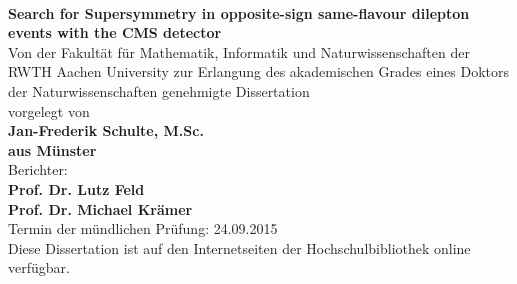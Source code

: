 \thispagestyle{empty}
\begin{center}
  ~ \\
  \vspace{-0.5cm}
 {\huge\bf{Search for Supersymmetry in opposite-sign same-flavour dilepton events with the CMS detector}\\}
  \vspace{2.5cm}
    { Von der Fakult\"at f\"ur Mathematik, Informatik und Naturwissenschaften der
RWTH Aachen University zur Erlangung des akademischen Grades
eines Doktors der Naturwissenschaften genehmigte Dissertation\\}
  \vspace{2.5cm}
    {\Large vorgelegt von}\\
    {\Large\bf Jan-Frederik Schulte, M.Sc.}\\
    {\Large\bf aus M\"unster } \\
    
  \vspace{3.cm}
    {\large Berichter: }\\
  	{\Large\bf Prof. Dr. Lutz Feld}\\
  	{\Large\bf Prof. Dr. Michael Kr\"amer}\\
  	
  \vspace{2.cm}
  {\Large Termin der m\"undlichen Pr\"ufung: 24.09.2015\\}
  \vspace{2cm}
  {\Large Diese Dissertation ist auf den Internetseiten der Hochschulbibliothek online verf\"ugbar.}	
\end{center}
\cleardoublepage
\newpage
\newpage